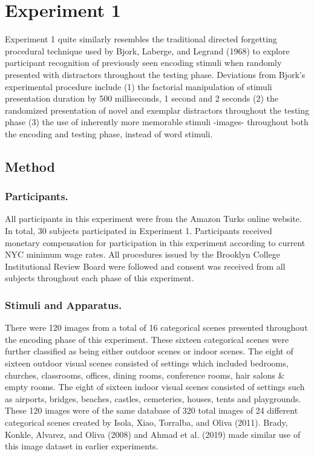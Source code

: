 \documentclass[
  man,floatsintext]{apa6}
\begin{document}
\hypertarget{experiment-1}{%
\section{Experiment 1}\label{experiment-1}}

Experiment 1 quite similarly resembles the traditional directed forgetting procedural technique used by Bjork, Laberge, and Legrand (1968) to explore participant recognition of previously seen encoding stimuli when randomly presented with distractors throughout the testing phase. Deviations from Bjork's experimental procedure include (1) the factorial manipulation of stimuli presentation duration by 500 milliseconds, 1 second and 2 seconds (2) the randomized presentation of novel and exemplar distractors throughout the testing phase (3) the use of inherently more memorable stimuli -images- throughout both the encoding and testing phase, instead of word stimuli.

\hypertarget{method}{%
\subsection{Method}\label{method}}

\hypertarget{participants.}{%
\subsubsection{Participants.}\label{participants.}}

All participants in this experiment were from the Amazon Turks online website. In total, 30 subjects participated in Experiment 1. Participants received monetary compensation for participation in this experiment according to current NYC minimum wage rates. All procedures issued by the Brooklyn College Institutional Review Board were followed and consent was received from all subjects throughout each phase of this experiment.

\hypertarget{stimuli-and-apparatus.}{%
\subsubsection{Stimuli and Apparatus.}\label{stimuli-and-apparatus.}}

There were 120 images from a total of 16 categorical scenes presented throughout the encoding phase of this experiment. These sixteen categorical scenes were further classified as being either outdoor scenes or indoor scenes. The eight of sixteen outdoor visual scenes consisted of settings which included bedrooms, churches, classrooms, offices, dining rooms, conference rooms, hair salons \& empty rooms. The eight of sixteen indoor visual scenes consisted of settings such as airports, bridges, beaches, castles, cemeteries, houses, tents and playgrounds. These 120 images were of the same database of 320 total images of 24 different categorical scenes created by Isola, Xiao, Torralba, and Oliva (2011). Brady, Konkle, Alvarez, and Oliva (2008) and Ahmad et al. (2019) made similar use of this image dataset in earlier experiments.
\end{document}
